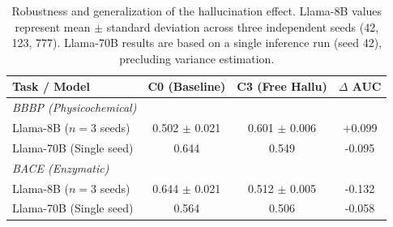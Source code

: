 \begin{table}[h]
\centering
\caption{Robustness and generalization of the hallucination effect. Llama-8B values represent mean $\pm$ standard deviation across three independent seeds (42, 123, 777). Llama-70B results are based on a single inference run (seed 42), precluding variance estimation.}
\label{tab:robustness}
\begin{tabular}{@{}lccc@{}}
\toprule
\textbf{Task / Model} & \textbf{C0 (Baseline)} & \textbf{C3 (Free Hallu)} & \textbf{$\Delta$ AUC} \\ \midrule
\textit{BBBP (Physicochemical)} & & & \\
Llama-8B ($n=3$ seeds) & 0.502 $\pm$ 0.021 & 0.601 $\pm$ 0.006 & +0.099 \\
Llama-70B (Single seed) & 0.644 & 0.549 & -0.095 \\ \midrule
\textit{BACE (Enzymatic)} & & & \\
Llama-8B ($n=3$ seeds) & 0.644 $\pm$ 0.021 & 0.512 $\pm$ 0.005 & -0.132 \\
Llama-70B (Single seed) & 0.564 & 0.506 & -0.058 \\ \bottomrule
\end{tabular}
\end{table}
